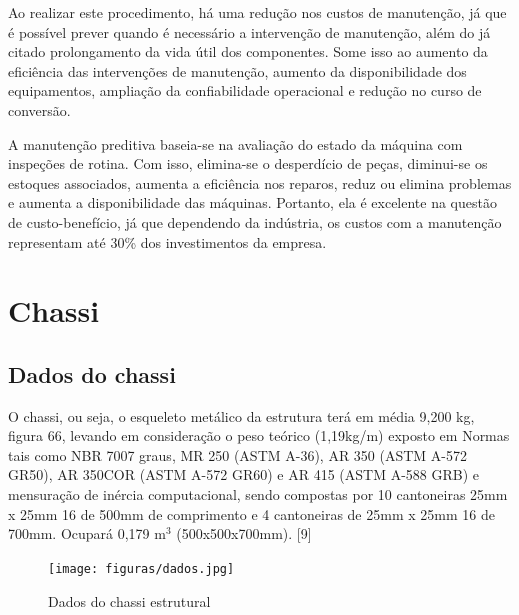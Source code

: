 Ao realizar este procedimento, há uma redução nos custos de manutenção, já que é possível prever quando é necessário a intervenção de manutenção, além do já citado prolongamento da vida útil dos componentes. Some isso ao aumento da eficiência das intervenções de manutenção, aumento da disponibilidade dos equipamentos, ampliação da confiabilidade operacional e redução no curso de conversão.

A manutenção preditiva baseia-se na avaliação do estado da máquina com inspeções de rotina. Com isso, elimina-se o desperdício de peças, diminui-se os estoques associados, aumenta a eficiência nos reparos, reduz ou elimina problemas e aumenta a disponibilidade das máquinas. Portanto, ela é excelente na questão de custo-benefício, já que dependendo da indústria, os custos com a manutenção representam até 30\% dos investimentos da empresa. \cite{zuniga2011}


\section{Chassi}

\subsection{Dados do chassi}

O chassi, ou seja, o esqueleto metálico da estrutura terá em média 9,200 kg, figura 66, levando em consideração o peso teórico (1,19kg/m) exposto em Normas tais como NBR 7007 graus, MR 250 (ASTM A-36), AR 350 (ASTM A-572 GR50), AR 350COR (ASTM A-572 GR60) e AR 415 (ASTM A-588 GRB) e mensuração de inércia computacional, sendo compostas por 10 cantoneiras 25mm x 25mm 16 de 500mm de comprimento e 4 cantoneiras de 25mm x 25mm 16 de 700mm. Ocupará 0,179 m$^{3}$ (500x500x700mm). [9]

\begin{figure}[H]
	\centering
	\texttt{[image: figuras/dados.jpg]}
	\caption{Dados do chassi estrutural} 
	\label{dados}
\end{figure}